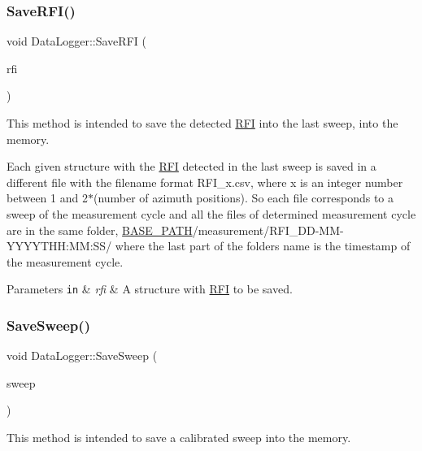 \subsubsection{\texorpdfstring{Save\+R\+F\+I()}{SaveRFI()}}
{\footnotesize\ttfamily void Data\+Logger\+::\+Save\+R\+FI (\begin{DoxyParamCaption}\item[{const \hyperlink{structRFI}{R\+FI} \&}]{rfi }\end{DoxyParamCaption})}



This method is intended to save the detected \hyperlink{structRFI}{R\+FI} into the last sweep, into the memory. 

Each given structure with the \hyperlink{structRFI}{R\+FI} detected in the last sweep is saved in a different file with the filename format R\+F\+I\+\_\+x.\+csv, where \textquotesingle{}x\textquotesingle{} is an integer number between 1 and 2$\ast$(number of azimuth positions). So each file corresponds to a sweep of the measurement cycle and all the files of determined measurement cycle are in the same folder, \hyperlink{Basics_8h_a0423f4cb393331ce0b9f6b3a43adcaae}{B\+A\+S\+E\+\_\+\+P\+A\+TH}/measurement/\+R\+F\+I\+\_\+\+D\+D-\/\+M\+M-\/\+Y\+Y\+Y\+Y\+T\+HH\+:MM\+:S\+S/ where the last part of the folder\textquotesingle{}s name is the timestamp of the measurement cycle. 
\begin{DoxyParams}[1]{Parameters}
\mbox{\tt in}  & {\em rfi} & A structure with \hyperlink{structRFI}{R\+FI} to be saved. \\
\hline
\end{DoxyParams}
\mbox{\label{classDataLogger_ab2063fcd87971520a5bfa5aef6d73fea}} 
\subsubsection{\texorpdfstring{Save\+Sweep()}{SaveSweep()}}
{\footnotesize\ttfamily void Data\+Logger\+::\+Save\+Sweep (\begin{DoxyParamCaption}\item[{const \hyperlink{structSweep}{Sweep} \&}]{sweep }\end{DoxyParamCaption})}



This method is intended to save a calibrated sweep into the memory. 


